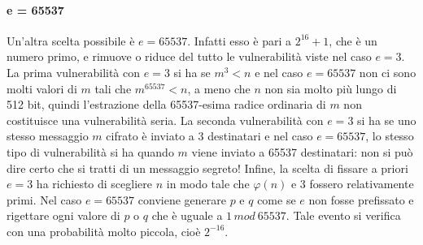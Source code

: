 \paragraph{e = 65537}
Un'altra scelta possibile è $e=65537$. Infatti esso è pari a $2^{16}+1$, che è un numero primo, e rimuove o riduce del tutto le vulnerabilità viste nel caso $e=3$. La prima vulnerabilità con $e=3$ si ha se $m^3<n$ e nel caso $e=65537$ non ci sono molti valori di $m$ tali che $m^{65537} < n$, a meno che $n$ non sia molto più lungo di 512 bit, quindi l'estrazione della 65537-esima radice ordinaria di $m$ non costituisce una vulnerabilità seria. La seconda vulnerabilità con $e=3$ si ha se uno stesso messaggio $m$ cifrato è inviato a 3 destinatari e nel caso $e=65537$, lo stesso tipo di vulnerabilità si ha quando $m$ viene inviato a 65537 destinatari: non si può dire certo che si tratti di un messaggio segreto! Infine, la scelta di fissare a priori $e=3$ ha richiesto di scegliere $n$ in modo tale che $\varphi(n)$ e 3 fossero relativamente primi. Nel caso $e=65537$ conviene generare $p$ e $q$ come se $e$ non fosse prefissato e rigettare ogni valore di $p$ o $q$ che è uguale a $1 \, mod \: 65537$. Tale evento si verifica con una probabilità molto piccola, cioè $2^{-16}$. 

